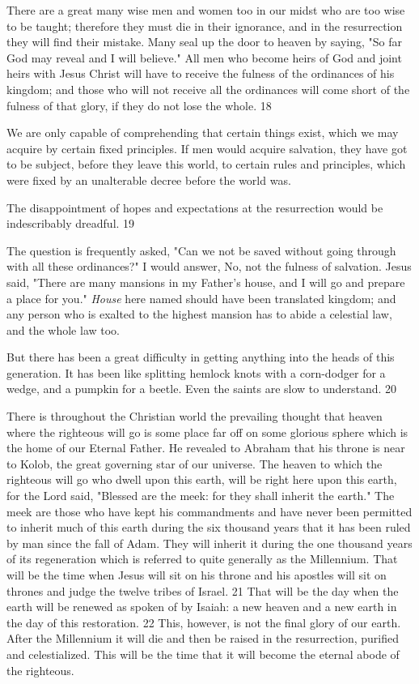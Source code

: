 There are a great many wise men and women too in our midst who are too wise to be taught;
therefore they must die in their ignorance, and in the resurrection they will find their mistake.
Many seal up the door to heaven by saying, "So far God may reveal and I will believe."
All men who become heirs of God and joint heirs with Jesus Christ will have to receive the
fulness of the ordinances of his kingdom; and those who will not receive all the ordinances
will come short of the fulness of that glory, if they do not lose the whole. 18

We are only capable of comprehending that certain things exist, which we may acquire by
certain fixed principles. If men would acquire salvation, they have got to be subject, before
they leave this world, to certain rules and principles, which were fixed by an unalterable
decree before the world was.

The disappointment of hopes and expectations at the resurrection would be indescribably
dreadful. 19

The question is frequently asked, "Can we not be saved without going through with all these
ordinances?" I would answer, No, not the fulness of salvation. Jesus said, "There are many
mansions in my Father's house, and I will go and prepare a place for you." \textit{House} here named
should have been translated kingdom; and any person who is exalted to the highest mansion
has to abide a celestial law, and the whole law too.

But there has been a great difficulty in getting anything into the heads of this generation. It
has been like splitting hemlock knots with a corn-dodger for a wedge, and a pumpkin for a
beetle. Even the saints are slow to understand. 20

There is throughout the Christian world the prevailing thought that heaven where the
righteous will go is some place far off on some glorious sphere which is the home of our
Eternal Father. He revealed to Abraham that his throne is near to Kolob, the great governing
star of our universe. The heaven to which the righteous will go who dwell upon this earth,
will be right here upon this earth, for the Lord said, "Blessed are the meek: for they shall
inherit the earth." The meek are those who have kept his commandments and have never
been permitted to inherit much of this earth during the six thousand years that it has been
ruled by man since the fall of Adam. They will inherit it during the one thousand years of its
regeneration which is referred to quite generally as the Millennium. That will be the time
when Jesus will sit on his throne and his apostles will sit on thrones and judge the twelve
tribes of Israel. 21 That will be the day when the earth will be renewed as spoken of by
Isaiah: a new heaven and a new earth in the day of this restoration. 22 This, however, is not
the final glory of our earth. After the Millennium it will die and then be raised in the
resurrection, purified and celestialized. This will be the time that it will become the eternal
abode of the righteous.


